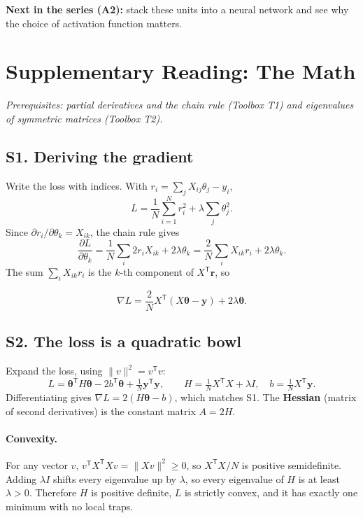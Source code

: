 \documentclass[11pt]{article}
\newcommand{\T}{\mathsf{T}}
\newcommand{\vth}{\bm{\theta}}
\newcommand{\grad}{\nabla}
\begin{document}
\textbf{Next in the series (A2):} stack these units into a neural network and see why the choice of activation function matters.

\clearpage
\section*{Supplementary Reading: The Math}
\textit{Prerequisites: partial derivatives and the chain rule (Toolbox T1) and eigenvalues of symmetric matrices (Toolbox T2).}

\label{sec:grad}
\subsection*{S1. Deriving the gradient}
Write the loss with indices. With $r_i=\sum_j X_{ij}\theta_j-y_i$,
\[
  L=\frac1N\sum_{i=1}^N r_i^2+\lambda\sum_j\theta_j^2 .
\]
Since $\partial r_i/\partial\theta_k=X_{ik}$, the chain rule gives
\[
  \frac{\partial L}{\partial\theta_k}
  =\frac1N\sum_i 2r_iX_{ik}+2\lambda\theta_k
  =\frac2N\sum_i X_{ik}r_i+2\lambda\theta_k .
\]
The sum $\sum_i X_{ik}r_i$ is the $k$-th component of $X^{\T}\mathbf r$, so
\begin{mathbox}
\[
  \grad L=\frac2N X^{\T}(X\vth-\mathbf y)+2\lambda\vth .
\]
\end{mathbox}

\subsection*{S2. The loss is a quadratic bowl}
Expand the loss, using $\lVert v\rVert^2=v^{\T}v$:
\[
  L=\vth^{\T}H\vth-2b^{\T}\vth+\tfrac1N\mathbf y^{\T}\mathbf y,
  \qquad H=\tfrac1N X^{\T}X+\lambda I,\quad b=\tfrac1N X^{\T}\mathbf y .
\]
Differentiating gives $\grad L=2(H\vth-b)$, which matches S1. The \textbf{Hessian} (matrix of second derivatives) is the constant matrix $A=2H$.

\paragraph{Convexity.} For any vector $v$, $v^{\T}X^{\T}Xv=\lVert Xv\rVert^2\ge0$, so $X^{\T}X/N$ is positive semidefinite. Adding $\lambda I$ shifts every eigenvalue up by $\lambda$, so every eigenvalue of $H$ is at least $\lambda>0$. Therefore $H$ is positive definite, $L$ is strictly convex, and it has exactly one minimum with no local traps.
\end{document}
